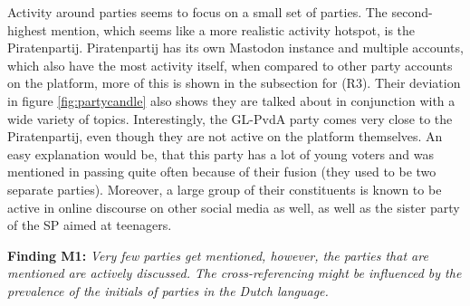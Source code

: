 Activity around parties seems to focus on a small set of parties.
The second-highest mention, which seems like a more realistic activity hotspot, is the Piratenpartij.
Piratenpartij has its own Mastodon instance and multiple accounts, which also have the most activity itself, when compared to other party accounts on the platform, more of this is shown in the subsection for (R3).
Their deviation in figure \ref{fig:partycandle} also shows they are talked about in conjunction with a wide variety of topics.
Interestingly, the GL-PvdA party comes very close to the Piratenpartij, even though they are not active on the platform themselves.
An easy explanation would be, that this party has a lot of young voters and was mentioned in passing quite often because of their fusion (they used to be two separate parties).
Moreover, a large group of their constituents is known to be active in online discourse on other social media as well, as well as the sister party of the SP aimed at teenagers. 

\textbf{Finding M1:} \textit{Very few parties get mentioned, however, the parties that are mentioned are actively discussed. The cross-referencing might be influenced by the prevalence of the initials of parties in the Dutch language.}

